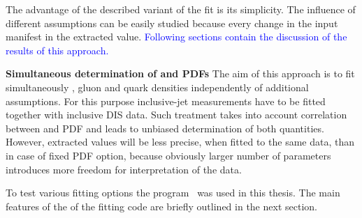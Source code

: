 The advantage of the described variant of the fit is its simplicity. The influence of different assumptions can be easily studied because every change in the input manifest in the extracted \asz value. \textcolor{blue}{Following sections contain the discussion of the results of this approach.}

{\flushleft \textbf{Simultaneous determination of \asz and PDFs}}\newline
The aim of this approach is to fit simultaneously \asz, gluon and quark densities independently of additional assumptions. For this purpose inclusive-jet measurements have to be fitted together with inclusive DIS data. Such treatment takes into account correlation between \as and PDF and leads to unbiased determination of both quantities. However, extracted values will be less precise, when fitted to the same data, than in case of fixed PDF option, because obviously larger number of parameters introduces more freedom for interpretation of the data.

To test various fitting options the \herafitter program~\cite{herafitter} was used in this thesis. The main features of the of the fitting code are briefly outlined in the next section. 